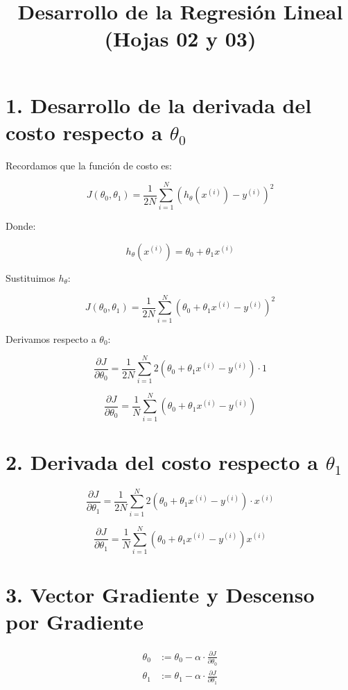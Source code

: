 \documentclass[12pt]{article}
\title{Desarrollo de la Regresión Lineal \\ (Hojas 02 y 03)}
\author{}
\date{}
\begin{document}
\maketitle

\section*{1. Desarrollo de la derivada del costo respecto a $\theta_0$}

Recordamos que la función de costo es:

\[
J(\theta_0, \theta_1) = \frac{1}{2N} \sum_{i=1}^N \left( h_\theta(x^{(i)}) - y^{(i)} \right)^2
\]

Donde:

\[
h_\theta(x^{(i)}) = \theta_0 + \theta_1 x^{(i)}
\]

Sustituimos $h_\theta$:

\[
J(\theta_0, \theta_1) = \frac{1}{2N} \sum_{i=1}^N \left( \theta_0 + \theta_1 x^{(i)} - y^{(i)} \right)^2
\]

Derivamos respecto a $\theta_0$:

\[
\frac{\partial J}{\partial \theta_0} = \frac{1}{2N} \sum_{i=1}^N 2 \left( \theta_0 + \theta_1 x^{(i)} - y^{(i)} \right) \cdot 1
\]

\[
\frac{\partial J}{\partial \theta_0} = \frac{1}{N} \sum_{i=1}^N \left( \theta_0 + \theta_1 x^{(i)} - y^{(i)} \right)
\]

\section*{2. Derivada del costo respecto a $\theta_1$}

\[
\frac{\partial J}{\partial \theta_1} = \frac{1}{2N} \sum_{i=1}^N 2 \left( \theta_0 + \theta_1 x^{(i)} - y^{(i)} \right) \cdot x^{(i)}
\]

\[
\frac{\partial J}{\partial \theta_1} = \frac{1}{N} \sum_{i=1}^N \left( \theta_0 + \theta_1 x^{(i)} - y^{(i)} \right) x^{(i)}
\]

\section*{3. Vector Gradiente y Descenso por Gradiente}

\begin{align*}
\theta_0 &:= \theta_0 - \alpha \cdot \frac{\partial J}{\partial \theta_0} \\
\theta_1 &:= \theta_1 - \alpha \cdot \frac{\partial J}{\partial \theta_1}
\end{align*}
\end{document}
